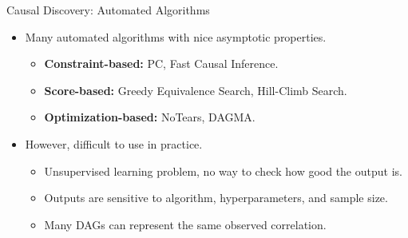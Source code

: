 \documentclass[aspectratio=169]{beamer}
\begin{document}
\begin{frame}{Causal Discovery: Automated Algorithms}
	\begin{itemize}
		\item Many automated algorithms with nice asymptotic properties.
			\begin{itemize}
				\item \textbf{Constraint-based:} PC, Fast Causal Inference.
				\item \textbf{Score-based:} Greedy Equivalence Search, Hill-Climb Search.
				\item \textbf{Optimization-based:} NoTears, DAGMA.
			\end{itemize}
		\item However, difficult to use in practice.
			\begin{itemize}
				\item Unsupervised learning problem, no way to check how good the output is.
				\item Outputs are sensitive to algorithm, hyperparameters, and sample size.
				\item Many DAGs can represent the same observed correlation.
			\end{itemize}
	\end{itemize}
\end{frame}
\end{document}

